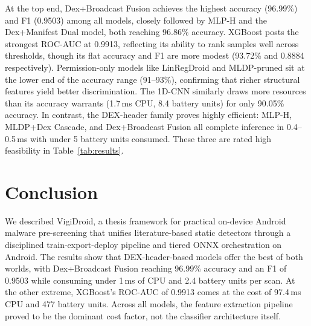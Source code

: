 \documentclass[conference]{IEEEtran}
\begin{document}
	At the top end, Dex+Broadcast Fusion achieves the highest accuracy (96.99\%) and F1 (0.9503) among all models, closely followed by MLP-H and the Dex+Manifest Dual model, both reaching 96.86\% accuracy.
	XGBoost posts the strongest ROC-AUC at 0.9913, reflecting its ability to rank samples well across thresholds, though its flat accuracy and F1 are more modest (93.72\% and 0.8884 respectively).
	Permission-only models like LinRegDroid and MLDP-pruned sit at the lower end of the accuracy range (91--93\%), confirming that richer structural features yield better discrimination.
	The 1D-CNN similarly draws more resources than its accuracy warrants (1.7\,ms CPU, 8.4 battery units) for only 90.05\% accuracy.
	In contrast, the DEX-header family proves highly efficient: MLP-H, MLDP+Dex Cascade, and Dex+Broadcast Fusion all complete inference in 0.4--0.5\,ms with under 5 battery units consumed.
	These three are rated high feasibility in Table~\ref{tab:results}.
	\section{Conclusion}
	We described VigiDroid, a thesis framework for practical on-device Android malware pre-screening that unifies literature-based static detectors through a disciplined train-export-deploy pipeline and tiered ONNX orchestration on Android.
	The results show that DEX-header-based models offer the best of both worlds, with Dex+Broadcast Fusion reaching 96.99\% accuracy and an F1 of 0.9503 while consuming under 1\,ms of CPU and 2.4 battery units per scan.
	At the other extreme, XGBoost's ROC-AUC of 0.9913 comes at the cost of 97.4\,ms CPU and 477 battery units.
	Across all models, the feature extraction pipeline proved to be the dominant cost factor, not the classifier architecture itself.
\end{document}
